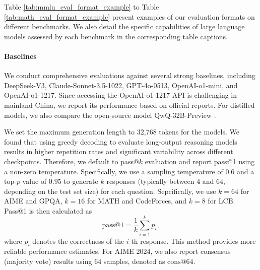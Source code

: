 Table \ref{tab:mmlu_eval_format_example} to Table \ref{tab:math_eval_format_example} present examples of our evaluation formats on different benchmarks.  We also detail the specific capabilities of large language models assessed by each benchmark in the corresponding table captions.



\paragraph{Baselines} We conduct comprehensive evaluations against several strong baselines, including DeepSeek-V3, Claude-Sonnet-3.5-1022, GPT-4o-0513, OpenAI-o1-mini, and OpenAI-o1-1217. Since accessing the OpenAI-o1-1217 API is challenging in mainland China, we report its performance based on official reports.
For distilled models, we also compare the open-source model QwQ-32B-Preview \citep{QwQ}.



\label{sec: evaluation_set}
We set the maximum generation length to 32,768 tokens for the models.
We found that using greedy decoding to evaluate long-output reasoning models results in higher repetition rates and significant variability across different checkpoints.
Therefore, we default to pass@$k$ evaluation \citep{codex} and report pass@1 using a non-zero temperature.
Specifically, we use a sampling temperature of $0.6$ and a top-$p$ value of $0.95$ to generate $k$ responses (typically between $4$ and $64$, depending on the test set size) for each question.
Sepcifically, we use $k=64$ for AIME and GPQA, $k=16$ for MATH and CodeForces, and $k=8$ for LCB.
Pass@1 is then calculated as
\[
\text{pass@1} = \frac{1}{k} \sum_{i=1}^{k} p_i,
\]
where $p_i$ denotes the correctness of the $i$-th response. This method provides more reliable performance estimates.
% 
For AIME 2024, we also report consensus (majority vote) results using $64$ samples, denoted as $\text{cons}@64$.

